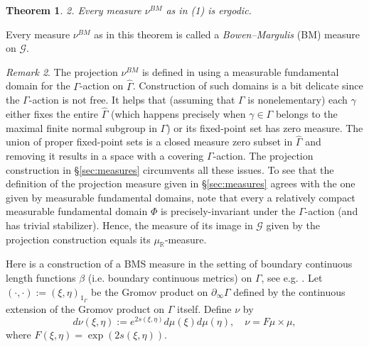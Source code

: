 \documentclass[12pt]{amsbook}%
\newtheorem{thm}{Theorem}[chapter]
\theoremstyle{definition}
\theoremstyle{remark}
\newtheorem{rem}[thm]{Remark}
\numberwithin{section}{chapter}
\numberwithin{subsection}{section}
\numberwithin{figure}{chapter}
\DeclareMathOperator{\R}{\mathbb{R}}
\def\Ga{\Gamma}
\def\ga{\gamma}
\def\geo{\partial_\infty}
\def\cG{{\mathscr{G}}}
\def\kap{}
\begin{document}
{{\begin{thm}

2. Every measure $\nu^{BM}$ as in (1) is ergodic. 
\end{thm}

Every measure $\nu^{BM}$ as in this theorem is called a {\em Bowen--Margulis} (BM) measure on $\cG$. 

\begin{rem}
The projection $\nu^{BM}$ is defined in \cite{BF} using a measurable fundamental domain for the $\Ga$-action on $\widehat \Ga$. Construction of such domains is a bit delicate since the $\Ga$-action is not free. It helps that (assuming that $\Ga$ is nonelementary) 
each $\ga$ either fixes the entire $\widehat \Ga$ (which happens precisely when $\ga\in \Ga$ belongs to the maximal finite normal subgroup in $\Ga$) 
or its fixed-point set has zero measure. The union of proper fixed-point sets is a closed measure zero subset in  $\widehat \Ga$ and removing it results in a space with a 
 covering $\Ga$-action. The projection construction in \S \ref{sec:measures} circumvents all these issues. To see that the definition of the projection measure given in 
 \S \ref{sec:measures} agrees with the one given by measurable fundamental domains, note that every a relatively compact measurable fundamental domain $\Phi$ is 
 precisely-invariant under the $\Ga$-action (and has trivial stabilizer). Hence, the measure of its image in $\cG$ given by the projection construction equals its 
 $\mu_{\R}$-measure. 
\end{rem}



Here is a construction of a BMS measure in the setting of boundary continuous length functions $\beta$ (i.e. boundary continuous metrics) on $\Ga$, see e.g. \cite{Tanaka}. 
Let $(\cdot, \cdot):= (\xi,\eta)_{1_\Ga}$ be the Gromov product on $\geo \Ga$ defined by the continuous extension of the  Gromov product on $\Ga$ itself. 
 Define $\nu$ by 
 $$
 d\nu(\xi,\eta):= e^{2s(\xi,\eta)} d\mu(\xi)d\mu(\eta), \quad \nu=F\mu\times \mu,
 $$
 where $F(\xi,\eta)=\exp(2s(\xi,\eta))$. 
 
}}
\end{document}
